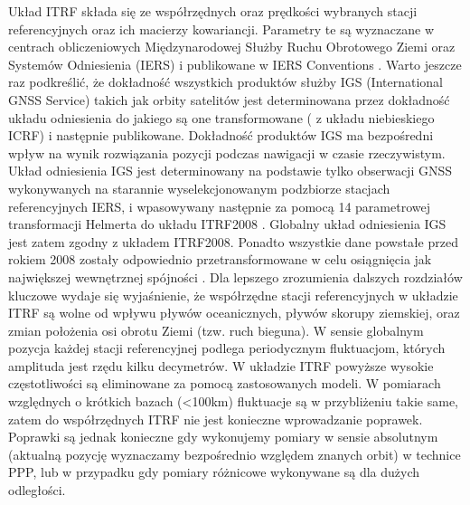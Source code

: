 Układ ITRF składa się ze współrzędnych oraz prędkości wybranych stacji referencyjnych oraz ich macierzy kowariancji. Parametry te są wyznaczane 
w centrach obliczeniowych Międzynarodowej Służby Ruchu Obrotowego Ziemi oraz Systemów Odniesienia (IERS) i publikowane w IERS Conventions \cite[][strona 167]{ROCZNIK_2014}.
Warto jeszcze raz podkreślić, że dokładność wszystkich produktów służby IGS (International GNSS Service) takich jak orbity satelitów jest determinowana 
przez dokładność układu odniesienia do jakiego są one transformowane ( z układu niebieskiego ICRF) i następnie publikowane. Dokładność produktów IGS 
ma bezpośredni wpływ na wynik rozwiązania pozycji podczas nawigacji w czasie rzeczywistym.
Układ odniesienia IGS jest determinowany na podstawie tylko obserwacji GNSS wykonywanych na starannie wyselekcjonowanym podzbiorze 
stacjach referencyjnych IERS, i wpasowywany następnie za pomocą 14 parametrowej transformacji Helmerta do układu ITRF2008 \cite[]{ALTAMIMI_2009}.
Globalny układ odniesienia IGS jest zatem zgodny z układem ITRF2008. Ponadto wszystkie dane powstałe przed rokiem 2008 zostały odpowiednio 
przetransformowane w celu osiągnięcia jak największej wewnętrznej spójności \cite[][strona 15]{KOUBA_2009}.
Dla lepszego zrozumienia dalszych rozdziałów kluczowe wydaje się wyjaśnienie, że współrzędne stacji referencyjnych w układzie ITRF 
są wolne od wpływu pływów oceanicznych, pływów skorupy ziemskiej, oraz zmian położenia osi obrotu Ziemi (tzw. ruch bieguna).
W sensie globalnym pozycja każdej stacji referencyjnej podlega periodycznym fluktuacjom, których amplituda jest rzędu kilku
decymetrów. W układzie ITRF powyższe wysokie częstotliwości są eliminowane za pomocą zastosowanych modeli. W pomiarach względnych o krótkich
bazach (<100km) fluktuacje są w przybliżeniu takie same, zatem do współrzędnych ITRF nie jest konieczne wprowadzanie poprawek.
Poprawki są jednak konieczne gdy wykonujemy pomiary w sensie absolutnym (aktualną pozycję wyznaczamy bezpośrednio względem znanych orbit)
w technice PPP, lub w przypadku gdy pomiary różnicowe wykonywane są dla dużych odległości. \cite[][strona 11]{KOUBA_2009}

